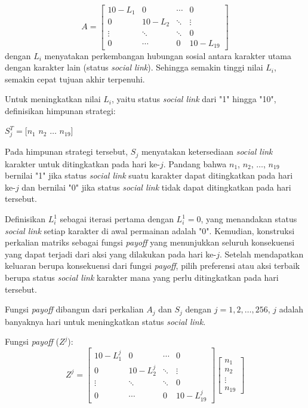 \[
    A =
    \begin{bmatrix}
        10-L_{1} & 0        & \cdots & 0         \\
        0        & 10-L_{2} & \ddots & \vdots    \\
        \vdots   & \ddots   & \ddots & 0         \\
        0        & \cdots   & 0      & 10-L_{19}
    \end{bmatrix}
\]
dengan $L_{i}$ menyatakan perkembangan hubungan sosial antara karakter utama dengan karakter lain (status \textit{social link}). Sehingga semakin tinggi nilai $L_{i}$, semakin cepat tujuan akhir terpenuhi.

Untuk meningkatkan nilai $L_{i}$, yaitu status \textit{social link} dari "1" hingga "10", definisikan himpunan strategi:
\begin{center}
    $S_{j}^{T} = [n_1$ $n_2$ $\dots$ $n_{19}]$
\end{center}

Pada himpunan strategi tersebut, $S_{j}$ menyatakan ketersediaan \textit{social link} karakter untuk ditingkatkan pada hari ke-$j$. Pandang bahwa $n_1$, $n_2$, $\dots$, $n_{19}$ bernilai "1" jika status \textit{social link} suatu karakter dapat ditingkatkan pada hari ke-$j$ dan bernilai "0" jika status \textit{social link} tidak dapat ditingkatkan pada hari tersebut.

Definisikan $L_{i}^{1}$ sebagai iterasi pertama dengan $L_{i}^{1} = 0$, yang menandakan status \textit{social link} setiap karakter di awal permainan adalah "0". Kemudian, konstruksi perkalian matriks sebagai fungsi \textit{payoff} yang menunjukkan seluruh konsekuensi yang dapat terjadi dari aksi yang dilakukan pada hari ke-$j$. Setelah mendapatkan keluaran berupa konsekuensi dari fungsi \textit{payoff}, pilih preferensi atau aksi terbaik berupa status \textit{social link} karakter mana yang perlu ditingkatkan pada hari tersebut.

Fungsi \textit{payoff} dibangun dari perkalian $A_{j}$ dan $S_{j}$ dengan $j = 1,2,\dots,256$, $j$ adalah banyaknya hari untuk meningkatkan status \textit{social link}.

Fungsi \textit{payoff} ($Z^{j}$):
\[
    Z^{j} =
    \begin{bmatrix}
        10-L_{1}^{j} & 0            & \cdots & 0             \\
        0            & 10-L_{2}^{j} & \ddots & \vdots        \\
        \vdots       & \ddots       & \ddots & 0             \\
        0            & \cdots       & 0      & 10-L_{19}^{j}
    \end{bmatrix}
    \begin{bmatrix}
        n_{1}  \\
        n_{2}  \\
        \vdots \\
        n_{19}
    \end{bmatrix}
\]


